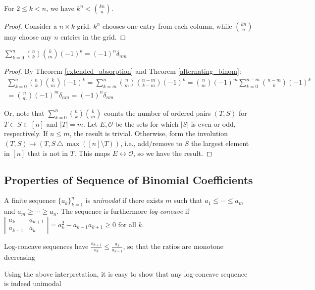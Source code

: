 \documentclass[a4paper]{article}
\begin{document}
\begin{example}
For $2\leq k<n$, we have $k^n<\binom{kn}n$.

\begin{hl}
\begin{proof}
Consider a $n\times k$ grid. $k^n$ chooses one entry from each column, while $\binom{kn}n$ may choose any $n$ entries in the grid.
\end{proof}
\end{hl}

\begin{lemma}\label{bin_inv_prep_1}
$\displaystyle\sum_{k=0}^n\binom nk\binom km(-1)^k=(-1)^n\delta_{nm}$

\begin{hl}
\begin{proof}
By Theorem \ref{extended_absorption} and Theorem \ref{alternating_binom}:
\begin{multline*}
\sum_{k=0}^n\binom nk\binom km(-1)^k
=\sum_{k=m}^n\binom nm\binom{n-m}{k-m}(-1)^k
=\binom nm(-1)^m\sum_{k=0}^{n-m}\binom{n-m}{k}(-1)^k\\
=\binom nm(-1)^m\delta_{nm}
=(-1)^n\delta_{nm}
\end{multline*}

Or, note that $\sum_{k=0}^n\binom nk\binom km$ counts the number of ordered pairs $(T,S)$ for $T\subset S\subset [n]$ and $|T|=m$. Let $E,\mathcal O$ be the sets for which $|S|$ is even or odd, respectively. If $n\leq m$, the result is trivial. Otherwise, form the involution $(T,S)\mapsto (T, S\,\triangle\,\max([n]\setminus T))$, i.e., add/remove to $S$ the largest element in $[n]$ that is not in $T$. This maps $E\leftrightarrow\mathcal O$, so we have the result.
\end{proof}
\end{hl}
\end{lemma}
\end{example}

\subsection{Properties of Sequence of Binomial Coefficients}

\begin{definition}
A finite sequence $\{a_k\}_{k=1}^n$ is \emph{unimodal} if there exists $m$ such that $a_1\leq\cdots\leq a_m$ and $a_m\geq\cdots\geq a_n$. The sequence is furthermore \emph{log-concave} if $|\begin{smallmatrix}a_k&a_{k+1}\\a_{k-1}&a_k\end{smallmatrix}|=a_k^2-a_{k-1}a_{k+1}\geq0$ for all $k$.
\begin{arrows}
\item Log-concave sequences have $\frac{a_{k+1}}{a_k}\leq\frac{a_k}{a_{k-1}}$, so that the ratios are monotone decreasing
\item Using the above interpretation, it is easy to show that any log-concave sequence is indeed unimodal
\end{arrows}
\end{definition}
\end{document}
